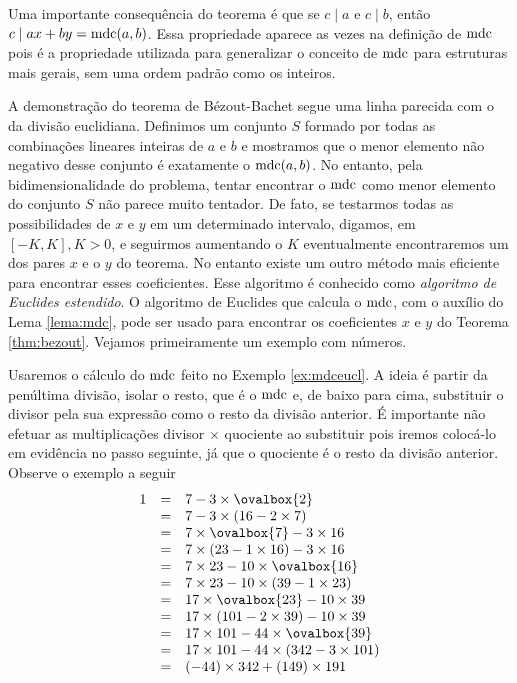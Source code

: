 Uma importante consequência do teorema é que se $c\mid
a$ e $c\mid b$, então $c\mid ax+by = \operatorname{mdc}(a,b)$. Essa
propriedade aparece as vezes na definição de $\operatorname{mdc}$ pois
é a propriedade utilizada para generalizar o conceito
de $\operatorname{mdc}$ para estruturas mais gerais, sem uma ordem
padrão como os inteiros.

A demonstração do teorema de Bézout-Bachet segue uma linha
parecida com o da divisão euclidiana. Definimos um
conjunto $S$ formado por todas as combinações lineares
inteiras de $a$ e $b$ e mostramos que o menor elemento
não negativo desse conjunto é exatamente o $\operatorname{mdc}(a,b)$. 
No entanto, pela bidimensionalidade do problema, tentar
encontrar o $\operatorname{mdc}$ como menor elemento do conjunto $S$ não 
parece muito tentador. De fato, se testarmos todas as
possibilidades de $x$ e $y$ em um determinado intervalo, 
digamos, em $[-K,K], K>0$, e seguirmos aumentando o $K$
eventualmente encontraremos um dos pares
$x$ e o $y$ do teorema. No entanto existe um outro método
mais eficiente para encontrar esses coeficientes. Esse
algoritmo é conhecido como \emph{algoritmo de Euclides
estendido}. O algoritmo
de Euclides que calcula o $\operatorname{mdc}$, com o auxílio do Lema
\ref{lema:mdc}, pode ser usado para encontrar
os coeficientes $x$ e $y$ do Teorema \ref{thm:bezout}.
Vejamos primeiramente um exemplo com números.

\begin{example}
Usaremos o cálculo do $\operatorname{mdc}$ feito no Exemplo \ref{ex:mdceucl}.
A ideia é partir da penúltima divisão, isolar o resto, que é o
$\operatorname{mdc}$ e, de baixo para cima, substituir o divisor pela
sua expressão como o resto da divisão anterior. É importante
não efetuar as multiplicações divisor $\times$ quociente
ao substituir pois iremos colocá-lo em evidência no passo
seguinte, já que o quociente é o resto da divisão anterior. Observe
o exemplo a seguir
$$
\begin{array}{rcl}
  1 & = & 7 - 3\times \ovalbox{2} \\
  & = & 7 - 3\times (16-2\times 7) \\
  & = & 7\times\ovalbox{7} - 3\times 16 \\
  & = & 7\times(23-1\times 16) - 3\times 16 \\
  & = & 7\times 23 -10\times \ovalbox{16} \\
  & = & 7\times 23 -10\times (39-1\times 23) \\
  & = & 17\times \ovalbox{23} -10\times 39 \\
  & = & 17\times (101-2\times 39) -10\times 39 \\
  & = & 17\times 101 -44\times \ovalbox{39} \\
  & = & 17\times 101 -44\times (342-3\times 101) \\  
  & = & (-44) \times 342 + (149)\times 191\\
\end{array}
$$
\end{example}


